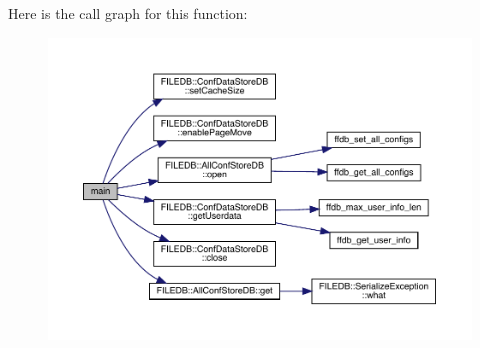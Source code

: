 Here is the call graph for this function\+:
\nopagebreak
\begin{figure}[H]
\begin{center}
\leavevmode
\includegraphics[width=350pt]{d8/dbf/adat-devel_2other__libs_2filedb_2src_2AllConfReadTest_8cpp_a3c04138a5bfe5d72780bb7e82a18e627_cgraph}
\end{center}
\end{figure}
